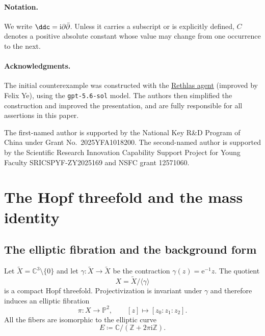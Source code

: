 \documentclass[11pt,a4paper]{article}
\begin{document}
	\paragraph*{Notation.}

	We write $\ddc=\mathrm{i}\partial\bar\partial$.  Unless it carries a
	subscript or is explicitly defined, $C$ denotes a positive absolute
	constant whose value may change from one occurrence to the next.

	\paragraph*{Acknowledgments.}
	
	The initial counterexample was constructed with the
	\href{https://github.com/frenzymath/Rethlas}{Rethlas agent} (improved by Felix Ye), using the
	\texttt{gpt-5.6-sol} model.  The authors then simplified the
	construction and improved the presentation, and are fully responsible
	for all assertions in this paper.
	
	The first-named author is supported by the National Key R\&D Program
	of China under Grant No.~2025YFA1018200.  The second-named author is
	supported by the Scientific Research Innovation Capability Support
	Project for Young Faculty SRICSPYF-ZY2025169 and NSFC grant 12571060.
	
	\section{The Hopf threefold and the mass identity}

	\subsection{The elliptic fibration and the background form}

	Let $\widetilde X=\mathbb C^3\setminus\{0\}$ and let
	$\gamma\colon\widetilde X\to\widetilde X$ be the contraction
	$\gamma(z)=\mathrm{e}^{-1}z$.  The quotient
	\[
		X=\widetilde X/\langle\gamma\rangle
	\]
	is a compact Hopf threefold.  Projectivization is invariant under $\gamma$
	and therefore induces an elliptic fibration
	\[
	\pi\colon X\longrightarrow\mathbb P^2,
	\qquad [z]\longmapsto[z_0:z_1:z_2].
	\]
	All the fibers are isomorphic to the elliptic curve
	\[
	E\coloneqq\mathbb C/(\mathbb Z+2\pi\mathrm{i}\mathbb Z).
	\]
	
\end{document}
